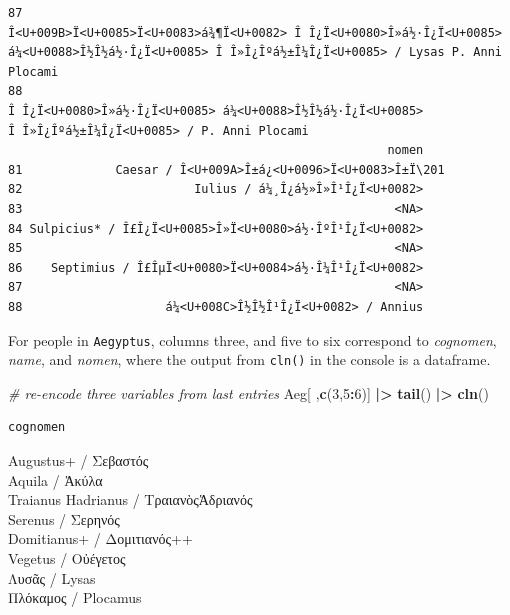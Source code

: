 \documentclass[a4paper,11pt]{memoir}
\newenvironment{Shaded}{\begin{snugshade}}{\end{snugshade}}
\newcommand{\CommentTok}[1]{\textcolor[rgb]{0.56,0.35,0.01}{\textit{#1}}}
\newcommand{\DecValTok}[1]{\textcolor[rgb]{0.00,0.00,0.81}{#1}}
\newcommand{\ErrorTok}[1]{\textcolor[rgb]{0.64,0.00,0.00}{\textbf{#1}}}
\newcommand{\KeywordTok}[1]{\textcolor[rgb]{0.13,0.29,0.53}{\textbf{#1}}}
\newcommand{\NormalTok}[1]{#1}
\newcommand{\OperatorTok}[1]{\textcolor[rgb]{0.81,0.36,0.00}{\textbf{#1}}}
\newcommand{\StringTok}[1]{\textcolor[rgb]{0.31,0.60,0.02}{#1}}
\begin{document}
\begin{verbatim}
87                                           Î<U+009B>Ï<U+0085>Ï<U+0083>á¾¶Ï<U+0082> Î Î¿Ï<U+0080>Î»á½·Î¿Ï<U+0085> á¼<U+0088>Î½Î½á½·Î¿Ï<U+0085> Î Î»Î¿Îºá½±Î¼Î¿Ï<U+0085> / Lysas P. Anni Plocami
88                                                                                         Î Î¿Ï<U+0080>Î»á½·Î¿Ï<U+0085> á¼<U+0088>Î½Î½á½·Î¿Ï<U+0085> Î Î»Î¿Îºá½±Î¼Î¿Ï<U+0085> / P. Anni Plocami
                                                     nomen
81             Caesar / Î<U+009A>Î±á¿<U+0096>Ï<U+0083>Î±Ï\201
82                        Iulius / á¼¸Î¿á½»Î»Î¹Î¿Ï<U+0082>
83                                                    <NA>
84 Sulpicius* / Î£Î¿Ï<U+0085>Î»Ï<U+0080>á½·ÎºÎ¹Î¿Ï<U+0082>
85                                                    <NA>
86    Septimius / Î£ÎµÏ<U+0080>Ï<U+0084>á½·Î¼Î¹Î¿Ï<U+0082>
87                                                    <NA>
88                    á¼<U+008C>Î½Î½Î¹Î¿Ï<U+0082> / Annius
\end{verbatim}

For people in \texttt{Aegyptus}, columns three, and five to six
correspond to \emph{cognomen}, \emph{name}, and \emph{nomen}, where the
output from \texttt{cln()} in the console is a dataframe.

\begin{Shaded}
\begin{Highlighting}[]
\CommentTok{# re-encode three variables from last entries}
\NormalTok{Aeg[ ,}\KeywordTok{c}\NormalTok{(}\DecValTok{3}\NormalTok{,}\DecValTok{5}\OperatorTok{:}\DecValTok{6}\NormalTok{)] }\OperatorTok{|}\ErrorTok{>}\StringTok{ }
\StringTok{  }\KeywordTok{tail}\NormalTok{() }\OperatorTok{|}\ErrorTok{>}\StringTok{ }
\StringTok{  }\KeywordTok{cln}\NormalTok{()}
\end{Highlighting}
\end{Shaded}

\begin{verbatim}
cognomen
\end{verbatim}

\noindent
Augustus+ / Σεβαστός \\
Aquila / Ἀκύλα \\
Traianus Hadrianus / ΤραιανὸςἉδριανός \\
Serenus / Σερηνός \\
Domitianus+ / Δομιτιανός++ \\
Vegetus / Οὐέγετος \\
Λυσᾶς / Lysas \\
Πλόκαμος / Plocamus\\
\end{document}
